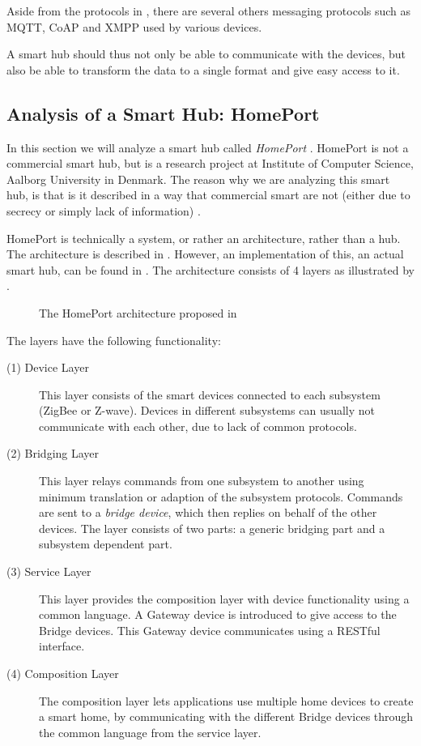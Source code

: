 Aside from the protocols in , 
there are several others messaging protocols such as MQTT, CoAP and XMPP used by various devices. 

A smart hub should thus not only be able to communicate with the devices, 
but also be able to transform the data to a single format and give easy access to it.

\subsection{Analysis of a Smart Hub: HomePort}\label{sec:homeport}
In this section we will analyze a smart hub called \emph{HomePort} \cite{HOMEPORT10}.
HomePort is not a commercial smart hub, 
but is a research project at Institute of Computer Science, Aalborg University in Denmark. 
The reason why we are analyzing this smart hub, 
is that is it described in a way that commercial smart are not (either due to secrecy or simply lack of information) \cite{HOMEPORT09, HOMEPORT10, HOMEPORT13}.  

HomePort is technically a system, or rather an architecture, rather than a hub. 
The architecture is described in \cite{HOMEPORT10}. 
However, an implementation of this, \ie an actual smart hub, can be found in \cite{HOMEPORT13}. 
The architecture consists of \num{4} layers as illustrated by .

\begin{figure}[!htb]
    \centering
    
    \caption{The HomePort architecture proposed in \protect\cite{HOMEPORT10}}
    \label{fig:homeport}
\end{figure}

The layers have the following functionality:
\begin{description}
    \item[(1) Device Layer] This layer consists of the smart devices connected to each subsystem (\eg ZigBee or Z-wave). Devices in different subsystems can usually not communicate with each other, due to lack of common protocols. 
    \item[(2) Bridging Layer] This layer relays commands from one subsystem to another using minimum translation or adaption of the subsystem protocols. Commands are sent to a \emph{bridge device}, which then replies on behalf of the other devices. The layer consists of two parts: a generic bridging part and a subsystem dependent part. 
    \item[(3) Service Layer] This layer provides the composition layer with device functionality using a common language. A Gateway device is introduced to give access to the Bridge devices. This Gateway device communicates using a RESTful interface. 
    \item[(4) Composition Layer] The composition layer lets applications use multiple home devices to create a smart home, by communicating with the different Bridge devices through the common language from the service layer. 
\end{description}

